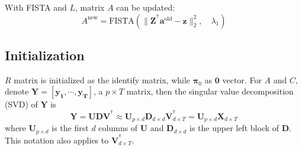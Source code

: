 \documentclass[fleqn]{article}
\newcommand{\T}{^{\ensuremath{\mathsf{T}}}}           %
\providecommand{\mb}[1]{\boldsymbol{#1}}
\newcommand{\by}{\mb{y}}
\newcommand{\bX}{\mb{X}}
\newcommand{\bY}{\mb{Y}}
\begin{document}
%
%



With FISTA and $L$, matrix $A$ can be updated:
\begin{equation}\label{eq:updatea}
A^{\text{new}} = \text{FISTA}(\|\mathbf{Z}^{\T}\mathbf{a}^{\text{old}} -\mathbf{z}\|_2^2,\quad \lambda_1)
\end{equation}

\subsection{Initialization}\label{sec:initial}
$R$ matrix is initialized as the identify matrix, while $\mathbf{\pi}_0$ as $\mathbf{0}$ vector. For $A$ and $C$, denote $\bY = \left[\mathbf{y_1},\cdots,\mathbf{y_T}\right]$, a $p\times T$ matrix, then the singular value decomposition (SVD) of $\bY$ is
\begin{equation}\label{eq:initial}
    \bY = \mathbf{UDV^{\T}} \approx \mathbf{U}_{p \times d} \mathbf{D}_{d \times d} \mathbf{V}_{d \times T}^{\T} =\mathbf{U}_{p\times d}\bX_{d \times T}
\end{equation}
where $\mathbf{U}_{p \times d}$ is the first $d$ columns of $\mathbf{U}$ and $\mathbf{D}_{d\times d}$ is the upper left block of $\mathbf{D}$. This notation also applies to $\mathbf{V}^{\T}_{d \times T}$.
\end{document}
